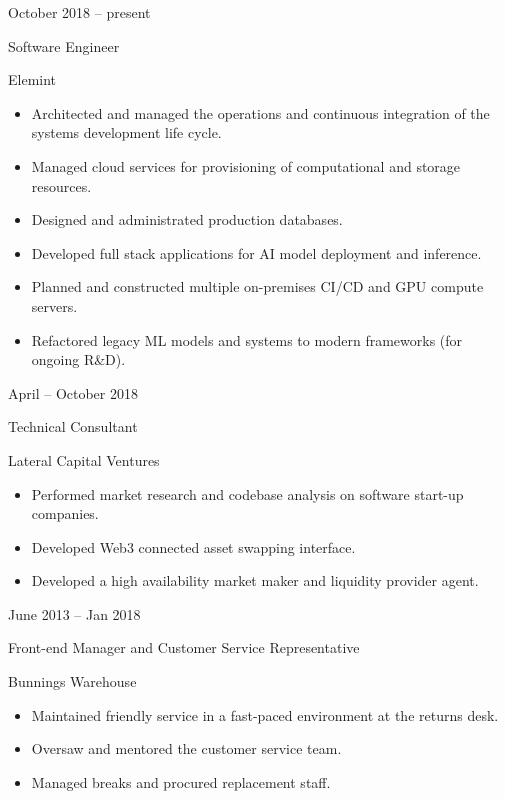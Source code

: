 \documentclass[a4paper,9pt]{article}
\newlength{\cvcolumngapwidth}
\newlength{\cvleftcolumnwidth}
\newlength{\cvrightcolumnwidth}
\newcommand{\cvtitlestyle}[1]{{\large\cvtitlefont\textcolor{cvtitlecolor}{#1}}}
\newcommand{\cvdurationstyle}[1]{{\small\cvdurationfont\textcolor{cvdurationcolor}{#1}}}
\newlength{\cvafteritemskipamount}
\newlength{\cvaftertitleskipamount}
\newlength{\cvparskip}
\newcommand{\cvitem}[2]{
    \begin{minipage}[t]{\cvleftcolumnwidth}
        \raggedleft #1
    \end{minipage}%
    \hspace{\cvcolumngapwidth}%
    \begin{minipage}[t]{\cvrightcolumnwidth}
        \setlength{\parskip}{\cvparskip} #2
    \end{minipage}

    \vspace{\cvafteritemskipamount}
}
\newcommand{\cvtitle}[1]{
    \cvtitlestyle{#1}

    \vspace{\cvaftertitleskipamount}
    \vspace{-\cvparskip}
}
\begin{document}
\cvitem{
    \cvdurationstyle{October 2018 -- present}
}{
    \cvtitle{Software Engineer}

    Elemint

    \begin{itemize}[leftmargin=*]
        \item Architected and managed the operations and continuous integration of the systems development life cycle.
        \item Managed cloud services for provisioning of computational and storage resources.
        \item Designed and administrated production databases.
        \item Developed full stack applications for AI model deployment and inference.
        \item Planned and constructed multiple on-premises CI/CD and GPU compute servers.
        \item Refactored legacy ML models and systems to modern frameworks (for ongoing R\&D).
    \end{itemize}
}

\cvitem{
    \cvdurationstyle{April -- October 2018}
}{
    \cvtitle{Technical Consultant}

    Lateral Capital Ventures

    \begin{itemize}[leftmargin=*]
        \item Performed market research and codebase analysis on software start-up companies.
        \item Developed Web3 connected asset swapping interface.
        \item Developed a high availability market maker and liquidity provider agent.
    \end{itemize}
}

\cvitem{
    \cvdurationstyle{June 2013 -- Jan 2018}
}{
    \cvtitle{Front-end Manager and Customer Service Representative}

    Bunnings Warehouse

    \begin{itemize}[leftmargin=*]
        \item Maintained friendly service in a fast-paced environment at the returns desk.
        \item Oversaw and mentored the customer service team.
        \item Managed breaks and procured replacement staff.
    \end{itemize}
}
\end{document}
